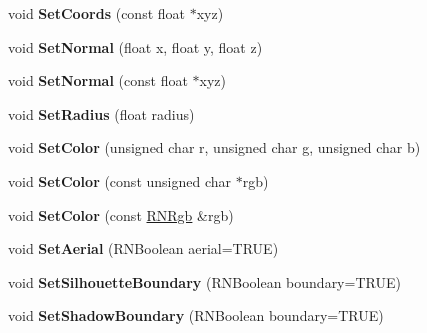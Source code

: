 \begin{DoxyCompactItemize}
\item 
void {\bfseries Set\+Coords} (const float $\ast$xyz)\hypertarget{class_r3_surfel_a95b10839c05fde3d1d23a80542450c8d}{}\label{class_r3_surfel_a95b10839c05fde3d1d23a80542450c8d}

\item 
void {\bfseries Set\+Normal} (float x, float y, float z)\hypertarget{class_r3_surfel_a3988e8403ed0db6cd635b7ce383971ac}{}\label{class_r3_surfel_a3988e8403ed0db6cd635b7ce383971ac}

\item 
void {\bfseries Set\+Normal} (const float $\ast$xyz)\hypertarget{class_r3_surfel_a03b8ee25d9827ef4ef54dc8fbd30b5a5}{}\label{class_r3_surfel_a03b8ee25d9827ef4ef54dc8fbd30b5a5}

\item 
void {\bfseries Set\+Radius} (float radius)\hypertarget{class_r3_surfel_a2372ea8b1f414fd2ba1ebcf15dae4f52}{}\label{class_r3_surfel_a2372ea8b1f414fd2ba1ebcf15dae4f52}

\item 
void {\bfseries Set\+Color} (unsigned char r, unsigned char g, unsigned char b)\hypertarget{class_r3_surfel_a810907ecb71272cca1a6b5475aab2c0f}{}\label{class_r3_surfel_a810907ecb71272cca1a6b5475aab2c0f}

\item 
void {\bfseries Set\+Color} (const unsigned char $\ast$rgb)\hypertarget{class_r3_surfel_aafe3d8b4430df0fe35f96475427774e9}{}\label{class_r3_surfel_aafe3d8b4430df0fe35f96475427774e9}

\item 
void {\bfseries Set\+Color} (const \hyperlink{class_r_n_rgb}{R\+N\+Rgb} \&rgb)\hypertarget{class_r3_surfel_abb7947e550b3c4f2b91e5bb658045e96}{}\label{class_r3_surfel_abb7947e550b3c4f2b91e5bb658045e96}

\item 
void {\bfseries Set\+Aerial} (R\+N\+Boolean aerial=T\+R\+UE)\hypertarget{class_r3_surfel_ad2433357c63f4f21248bc6c731118dc4}{}\label{class_r3_surfel_ad2433357c63f4f21248bc6c731118dc4}

\item 
void {\bfseries Set\+Silhouette\+Boundary} (R\+N\+Boolean boundary=T\+R\+UE)\hypertarget{class_r3_surfel_a7deef87c064105c700faf4959153d82a}{}\label{class_r3_surfel_a7deef87c064105c700faf4959153d82a}

\item 
void {\bfseries Set\+Shadow\+Boundary} (R\+N\+Boolean boundary=T\+R\+UE)\hypertarget{class_r3_surfel_a51157685daeba803b1cb272c3c2096df}{}\label{class_r3_surfel_a51157685daeba803b1cb272c3c2096df}


\end{DoxyCompactItemize}
